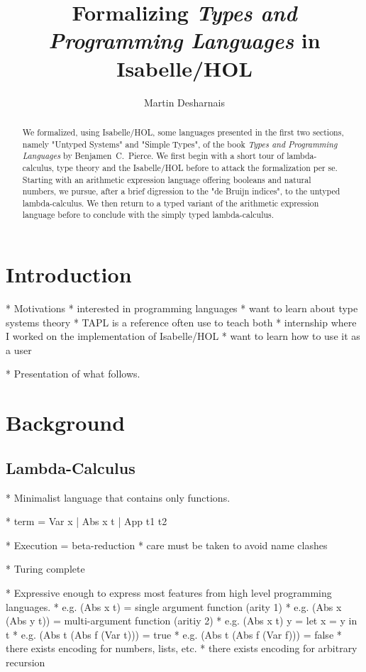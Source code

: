 \documentclass[a4paper, oneside, 12pt, titlepage]{article}
\begin{document}
\title{Formalizing \emph{Types and Programming Languages} in Isabelle/HOL}
\author{Martin Desharnais}
\maketitle

\begin{abstract}
We formalized, using Isabelle/HOL, some languages presented in the first two sections, namely
"Untyped Systems" and "Simple Types", of the book \emph{Types and Programming Languages} by
Benjamen~C.~Pierce. We first begin with a short tour of lambda-calculus, type theory and the
Isabelle/HOL before to attack the formalization per se. Starting with an arithmetic expression
language offering booleans and natural numbers, we pursue, after a brief digression to the "de
Bruijn indices", to the untyped lambda-calculus. We then return to a typed variant of the arithmetic
expression language before to conclude with the simply typed lambda-calculus.
\end{abstract}

\tableofcontents
\newpage

\section{Introduction}

  * Motivations
    * interested in programming languages
    * want to learn about type systems theory
      * TAPL is a reference often use to teach both
    * internship where I worked on the implementation of Isabelle/HOL
    * want to learn how to use it as a user

  * Presentation of what follows.

\section{Background}

\subsection{Lambda-Calculus}

  * Minimalist language that contains only functions.

  * term = Var x | Abs x t | App t1 t2

  * Execution = beta-reduction
    * care must be taken to avoid name clashes

  * Turing complete

  * Expressive enough to express most features from high level programming languages.
    * e.g. (Abs x t) = single argument function (arity 1)
    * e.g. (Abs x (Abs y t)) = multi-argument function (aritiy 2)
    * e.g. (Abs x t) y = let x = y in t
    * e.g. (Abs t (Abs f (Var t))) = true
    * e.g. (Abs t (Abs f (Var f))) = false
    * there exists encoding for numbers, lists, etc.
    * there exists encoding for arbitrary recursion
\end{document}
